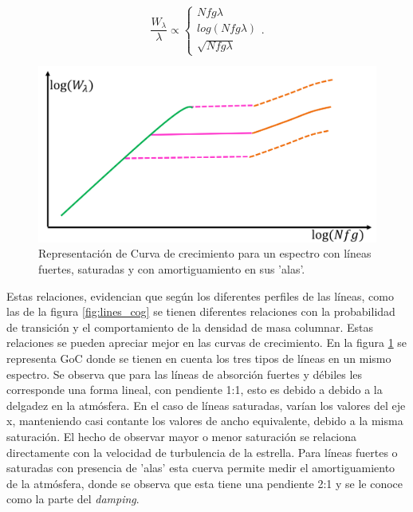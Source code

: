 \documentclass[12pt,oneside,openany,letter]{book}
\begin{document}
\begin{equation}
        \frac{W_{\lambda}}{\lambda} \propto\left\{\begin{array}{l}
        Nfg\lambda \\
        log(Nfg\lambda) \\
        \sqrt{Nfg\lambda}
        \end{array}\right..
        \label{ec:relation_W_fg}
        \end{equation}


\begin{figure}[h]
    \centering
    \includegraphics[width=0.75\linewidth]{Images/goc.png}
    \caption{Representación de Curva de crecimiento para un espectro con líneas fuertes, saturadas y con amortiguamiento en sus 'alas'.}
    \label{fig:GoC}
\end{figure}

Estas relaciones, evidencian que según los diferentes perfiles de las líneas, como las de la figura \ref{fig:lines_cog} se tienen diferentes relaciones con la probabilidad de transición y el comportamiento de la densidad de masa columnar. Estas relaciones se pueden apreciar mejor en las curvas de crecimiento. En la figura \ref{fig:GoC} se representa GoC donde se tienen en cuenta los tres tipos de líneas en un mismo espectro. Se observa que para las líneas de absorción fuertes y débiles les corresponde una forma lineal, con pendiente 1:1, esto es debido a debido a la delgadez en la atmósfera. En el caso de líneas saturadas, varían los valores del eje x, manteniendo casi contante los valores de ancho equivalente, debido a la misma saturación. El hecho de observar mayor o menor saturación se relaciona directamente con la velocidad de turbulencia de la estrella. Para líneas fuertes o saturadas con presencia de 'alas' esta cuerva permite medir el amortiguamiento de la atmósfera, donde se observa que esta tiene una pendiente 2:1 y se le conoce como la parte del \textit{damping}.
\end{document}
